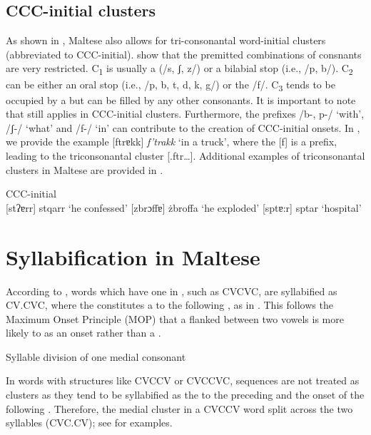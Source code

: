 \documentclass[output=paper]{langsci/langscibook}
\begin{document}
\subsection{CCC-initial clusters} 
As shown in , Maltese also allows for tri-consonantal word-initial clusters (abbreviated to CCC-initial). \citet{maltese_book} show that the premitted combinations of consnants are very restricted. C\textsubscript{1} is usually a  (/s, ʃ, z/) or a bilabial stop (i.e., /p, b/). C\textsubscript{2} can be either an oral stop (i.e., /p, b, t, d, k, g/) or the  /f/. C\textsubscript{3} tends to be occupied by a  but can be filled by any other consonants. It is important to note that  still applies in CCC-initial clusters. Furthermore, the prefixes /b-, p-/ ‘with’, /ʃ-/ ‘what’ and /f-/ ‘in’ can contribute to the creation of CCC-initial onsets. In , we provide the example [ftrɐkk] \textit{f’trakk} ‘in a truck’, where the  [f] is a prefix, leading to the triconsonantal cluster [.ftr…]. Additional examples of triconsonantal clusters in Maltese are provided in .

\ea\label{ex:galea:7}
{CCC-initial}\\
\ea 
{[stʔɐrr] stqarr ‘he confessed’}
\ex 
{[zbrɔffɐ] żbroffa ‘he exploded’}
\ex 
{[sptɐ:r] sptar ‘hospital’}
\z
\z

\section{Syllabification in Maltese}%
According to \citet{maltese_book},  words which have one  in , such as CVCVC, are syllabified as CV.CVC, where the  constitutes a  to the following , as in . This follows the Maximum Onset Principle (MOP) that a  flanked between two vowels is more likely to  as an onset rather than a  \citep[cf.][]{kahn1976}.

\ea\label{ex:galea:8}
{Syllable division of one medial consonant}\\
\z
\z

In  words with structures like CVCCV or CVCCVC,  sequences are not treated as  clusters as they tend to be syllabified as the  to the preceding  and the onset of the following  \citep[cf.][]{azzopardi1981phonetics}. Therefore, the medial cluster in a CVCCV word split across the two syllables (CVC.CV); see  for examples. 
\end{document}
